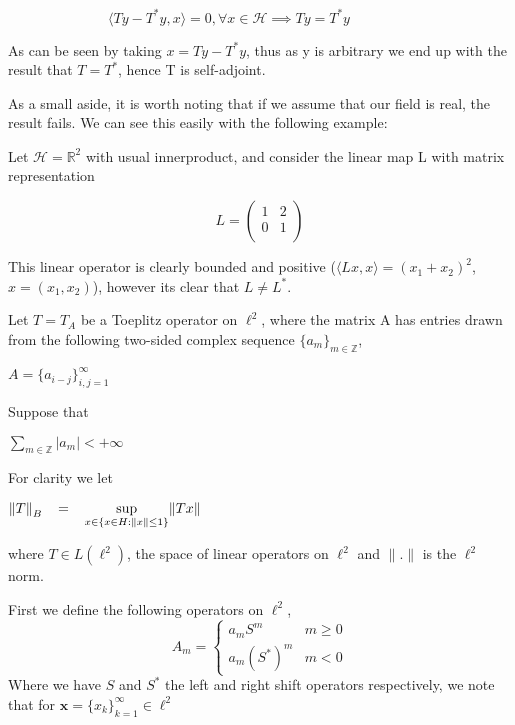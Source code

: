 \documentclass[10pt,a4paper]{article}
\begin{document}
$ \hspace{3cm} \langle Ty - T^*y , x \rangle = 0, \forall x \in \mathcal{H} \implies Ty = T^*y$

As can be seen by taking $x = Ty - T^*y$, thus as y is arbitrary we end up with the result that $T=T^*$, hence T is self-adjoint. 

As a small aside, it is worth noting that if we assume that our field is real, the result fails. We can see this easily with the following example:

Let $\mathcal{H} = \mathbb{R}^2$ with usual innerproduct, and consider the linear map L with matrix representation 

\[ L = \left( \begin{array}{ccc}
1 & 2 \\
0 & 1 \\
 \end{array} \right)\] 
 
This linear operator is clearly bounded and positive ($\langle Lx , x \rangle = (x_1+x_2)^2$, \hspace{2cm} $x = (x_1 , x_2)$), however its clear that $L \neq L^*$.



Let $T = T_A$ be a Toeplitz operator on $\ell^2$, where the matrix A has entries drawn from the following two-sided complex sequence $\lbrace a_m \rbrace_{m \in \mathbb{Z}}$,

\hspace{5cm} $A = \lbrace a_{i-j} \rbrace^\infty_{i,j = 1}$

Suppose that 

\hspace{5cm}$\sum\limits_{m \in \mathbb{Z}}|a_m| < +\infty$

For clarity we let 

\hspace{4cm}${\lVert T \rVert}_B\hspace{3mm} =\hspace{3mm} \sup\limits_{x \in \lbrace x \in H : \lVert x \rVert \le 1 \rbrace} \lVert Tx \rVert$ 

where $T \in L(\ell^2)$, the space of linear operators on $\ell^2$ and $\lVert . \rVert$ is the $\ell^2$ norm.

First we define the following operators on $\ell^2$,
\[ A_m = \begin{cases}
        a_mS^m  &  m \ge 0\\
        a_m(S^*)^m & m < 0
        \end{cases}
\]
Where we have $S$ and $S^*$ the left and right shift operators respectively, we note that for $\mathbf{x} = \lbrace x_k \rbrace^\infty_{k=1} \in \ell^2 $
\end{document}
